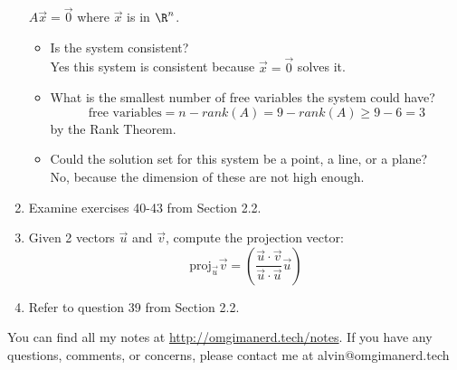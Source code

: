 \documentclass{math}
\begin{document}
\begin{enumerate}
    \( A\vec{x} = \vec{0} \) where \( \vec{x} \) is in \( \R^n \).
    \begin{itemize}
      \item Is the system consistent? \\
        Yes this system is consistent because \( \vec{x} = \vec{0} \) solves it.
      \item What is the smallest number of free variables the system could have?
        \[ \text{free variables} = n-rank(A) = 9-rank(A) \ge 9-6 = 3 \]
        by the Rank Theorem.
      \item Could the solution set for this system be a point, a line, or a
        plane? \\
        No, because the dimension of these are not high enough.
    \end{itemize}
  \item Examine exercises 40-43 from Section 2.2.
  \item Given 2 vectors \( \vec{u} \) and \( \vec{v} \), compute the projection
    vector:
    \[ \text{proj}_{\vec{u}}\vec{v} =
      (\frac{\vec{u}\cdot\vec{v}}{\vec{u}\cdot\vec{u}}\vec{u}) \]
  \item Refer to question 39 from Section 2.2.
\end{enumerate}

\begin{center}
  You can find all my notes at \url{http://omgimanerd.tech/notes}. If you have
  any questions, comments, or concerns, please contact me at
  alvin@omgimanerd.tech
\end{center}
\end{document}
